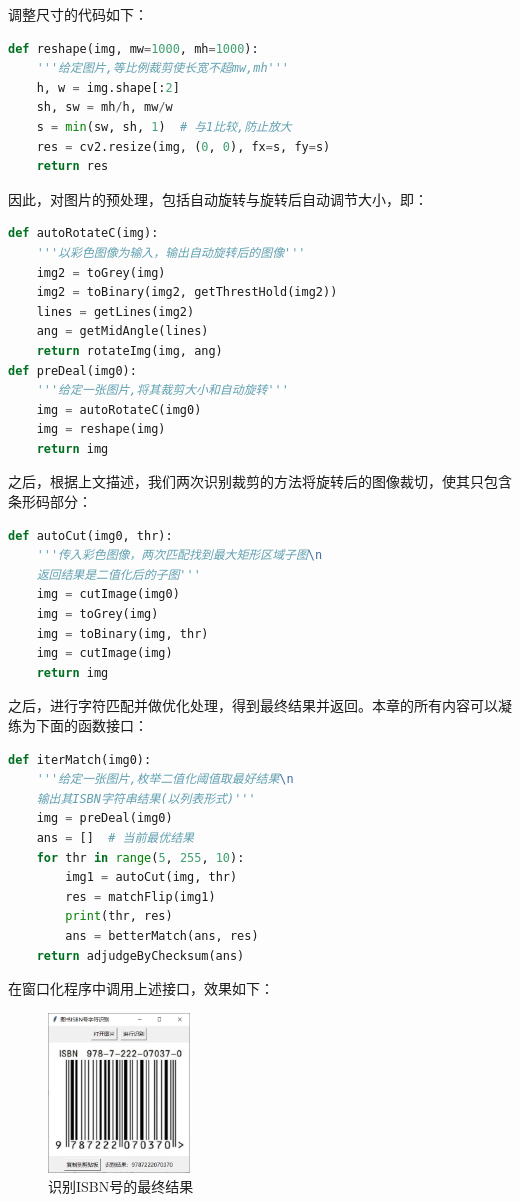 \documentclass{ctexart}
\begin{document}
调整尺寸的代码如下：

\begin{lstlisting}[language=python]
def reshape(img, mw=1000, mh=1000):
    '''给定图片,等比例裁剪使长宽不超mw,mh'''
    h, w = img.shape[:2]
    sh, sw = mh/h, mw/w
    s = min(sw, sh, 1)  # 与1比较,防止放大
    res = cv2.resize(img, (0, 0), fx=s, fy=s)
    return res
\end{lstlisting}

因此，对图片的预处理，包括自动旋转与旋转后自动调节大小，即：

\begin{lstlisting}[language=python]
def autoRotateC(img):
    '''以彩色图像为输入，输出自动旋转后的图像'''
    img2 = toGrey(img)
    img2 = toBinary(img2, getThrestHold(img2))
    lines = getLines(img2)
    ang = getMidAngle(lines)
    return rotateImg(img, ang)
def preDeal(img0):
    '''给定一张图片,将其裁剪大小和自动旋转'''
    img = autoRotateC(img0)
    img = reshape(img)
    return img
\end{lstlisting}

之后，根据上文描述，我们两次识别裁剪的方法将旋转后的图像裁切，使其只包含条形码部分：

\begin{lstlisting}[language=python]
def autoCut(img0, thr):
    '''传入彩色图像，两次匹配找到最大矩形区域子图\n
    返回结果是二值化后的子图'''
    img = cutImage(img0)
    img = toGrey(img)
    img = toBinary(img, thr)
    img = cutImage(img)
    return img
\end{lstlisting}

之后，进行字符匹配并做优化处理，得到最终结果并返回。本章的所有内容可以凝练为下面的函数接口：

\begin{lstlisting}[language=python]
def iterMatch(img0):
    '''给定一张图片,枚举二值化阈值取最好结果\n
    输出其ISBN字符串结果(以列表形式)'''
    img = preDeal(img0)
    ans = []  # 当前最优结果
    for thr in range(5, 255, 10):
        img1 = autoCut(img, thr)
        res = matchFlip(img1)
        print(thr, res)
        ans = betterMatch(ans, res)
    return adjudgeByChecksum(ans)
\end{lstlisting}

在窗口化程序中调用上述接口，效果如下：
\begin{figure}[H]
    \centering
    \includegraphics[height=120pt]{sample_stdout}
    \caption{识别ISBN号的最终结果}
\end{figure}
\end{document}
